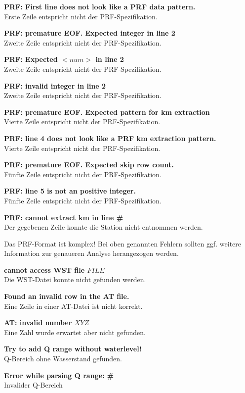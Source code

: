 \textbf{PRF: First line does not look like a PRF data pattern.}
\\Erste Zeile entspricht nicht der PRF-Spezifikation.

\textbf{PRF: premature EOF. Expected integer in line 2}
\\Zweite Zeile entspricht nicht der PRF-Spezifikation.

\textbf{PRF: Expected $<num>$ in line 2}
\\Zweite Zeile entspricht nicht der PRF-Spezifikation.

\textbf{PRF: invalid integer in line 2}
\\Zweite Zeile entspricht nicht der PRF-Spezifikation.

\textbf{PRF: premature EOF. Expected pattern for km extraction}
\\Vierte Zeile entspricht nicht der PRF-Spezifikation.

\textbf{PRF: line 4 does not look like a PRF km extraction pattern.}
\\Vierte Zeile entspricht nicht der PRF-Spezifikation.

\textbf{PRF: premature EOF. Expected skip row count.}
\\Fünfte Zeile entspricht nicht der PRF-Spezifikation.

\textbf{PRF: line 5 is not an positive integer.}
\\Fünfte Zeile entspricht nicht der PRF-Spezifikation.

\textbf{PRF: cannot extract km in line \#}
\\Der gegebenen Zeile konnte die Station nicht entnommen werden.

Das PRF-Format ist komplex! Bei oben genannten Fehlern sollten ggf. weitere
Information zur genaueren Analyse herangezogen werden.

\textbf{cannot access WST file $FILE$}
\\Die WST-Datei konnte nicht gefunden werden.

\textbf{Found an invalid row in the AT file.}
\\Eine Zeile in einer AT-Datei ist nicht korrekt.

\textbf{AT: invalid number $XYZ$}
\\Eine Zahl wurde erwartet aber nicht gefunden.

\textbf{Try to add Q range without waterlevel!}
\\Q-Bereich ohne Wasserstand gefunden.

\textbf{Error while parsing Q range: \#}
\\Invalider Q-Bereich


